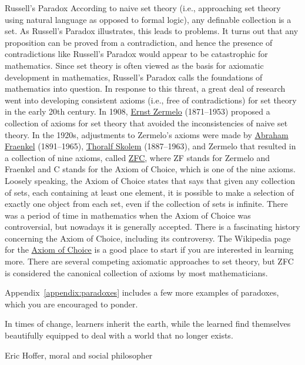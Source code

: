 \begin{section}{Russell's Paradox}
According to naive set theory (i.e., approaching set theory using natural language as opposed to formal logic), any definable collection is a set. As Russell's Paradox illustrates, this leads to problems.  It turns out that any proposition can be proved from a contradiction, and hence the presence of contradictions like Russell's Paradox would appear to be catastrophic for mathematics.  Since set theory is often viewed as the basis for axiomatic development in mathematics, Russell's Paradox calls the foundations of mathematics into question. In response to this threat, a great deal of research went into developing consistent axioms (i.e., free of contradictions) for set theory in the early 20th century. In 1908, \href{https://en.wikipedia.org/wiki/Ernst_Zermelo}{Ernst Zermelo} (1871--1953) proposed a collection of axioms for set theory that avoided the inconsistencies of naive set theory. In the 1920s, adjustments to Zermelo's axioms were made by \href{https://en.wikipedia.org/wiki/Abraham_Fraenkel}{Abraham Fraenkel} (1891--1965), \href{https://en.wikipedia.org/wiki/Thoralf_Skolem}{Thoralf Skolem} (1887--1963), and Zermelo that resulted in a collection of nine axioms, called \href{https://en.wikipedia.org/wiki/Zermelo-Fraenkel_set_theory}{ZFC}, where ZF stands for Zermelo and Fraenkel and C stands for the Axiom of Choice, which is one of the nine axioms. Loosely speaking, the Axiom of Choice states that says that given any collection of sets, each containing at least one element, it is possible to make a selection of exactly one object from each set, even if the collection of sets is infinite. There was a period of time in mathematics when the Axiom of Choice was controversial, but nowadays it is generally accepted.  There is a fascinating history concerning the Axiom of Choice, including its controversy.  The Wikipedia page for the \href{https://en.wikipedia.org/wiki/Axiom_of_choice}{Axiom of Choice} is a good place to start if you are interested in learning more. There are several competing axiomatic approaches to set theory, but ZFC is considered the canonical collection of axioms by most mathematicians.

Appendix~\ref{appendix:paradoxes} includes a few more examples of paradoxes, which you are encouraged to ponder.

\epigraph{In times of change, learners inherit the earth, while the learned find themselves beautifully equipped to deal with a world that no longer exists.}{Eric Hoffer, moral and social philosopher}

\end{section}